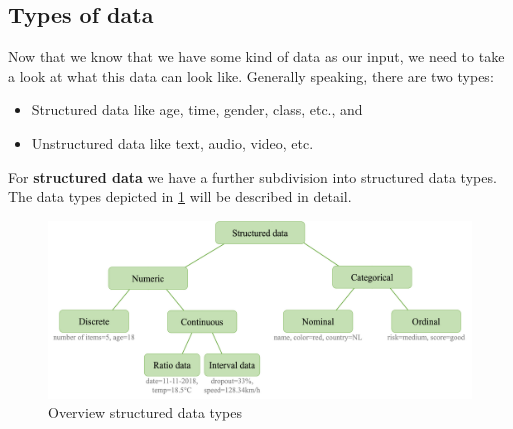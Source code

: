 \subsection{Types of data}
Now that we know that we have some kind of data as our input, we need to take a look at what this data can look like. Generally speaking, there are two types:
\begin{itemize}
  \item {}Structured data like age, time, gender, class, etc., and
  \item {}Unstructured data like text, audio, video, etc.
\end{itemize}

For \textbf{structured data} we have a further subdivision into structured data types. The data types depicted in \ref{fig:1_structured_data} will be described in detail.

\begin{figure}[h]
  \centering
  \includegraphics[width=\textwidth]{assets/basics/structured_data.png}
  \caption{Overview structured data types}
  \label{fig:1_structured_data}
\end{figure}

